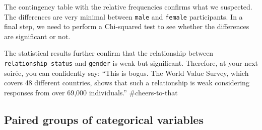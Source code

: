 \documentclass[
]{book}
\newenvironment{Shaded}{\begin{snugshade}}{\end{snugshade}}
\newcommand{\AttributeTok}[1]{\textcolor[rgb]{0.77,0.63,0.00}{#1}}
\newcommand{\CommentTok}[1]{\textcolor[rgb]{0.56,0.35,0.01}{\textit{#1}}}
\newcommand{\DocumentationTok}[1]{\textcolor[rgb]{0.56,0.35,0.01}{\textbf{\textit{#1}}}}
\newcommand{\FunctionTok}[1]{\textcolor[rgb]{0.00,0.00,0.00}{#1}}
\newcommand{\NormalTok}[1]{#1}
\newcommand{\OtherTok}[1]{\textcolor[rgb]{0.56,0.35,0.01}{#1}}
\newcommand{\SpecialCharTok}[1]{\textcolor[rgb]{0.00,0.00,0.00}{#1}}
\newcommand{\StringTok}[1]{\textcolor[rgb]{0.31,0.60,0.02}{#1}}
\begin{document}
The contingency table with the relative frequencies confirms what we suspected. The differences are very minimal between \texttt{male} and \texttt{female} participants. In a final step, we need to perform a Chi-squared test to see whether the differences are significant or not.

\begin{Shaded}
\end{Shaded}

The statistical results further confirm that the relationship between \texttt{relationship\_status} and \texttt{gender} is weak but significant. Therefore, at your next soirée, you can confidently say: ``This is bogus. The World Value Survey, which covers 48 different countries, shows that such a relationship is weak considering responses from over 69,000 individuals.'' \#cheers-to-that

\hypertarget{paired-groups-categorical-variables}{%
\subsection{Paired groups of categorical variables}\label{paired-groups-categorical-variables}}
\end{document}
